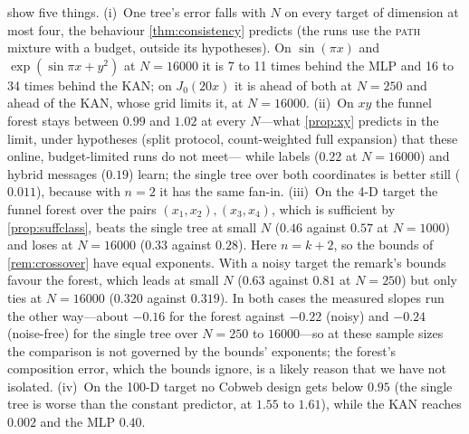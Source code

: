 \documentclass[11pt]{article}
\theoremstyle{definition}
\theoremstyle{remark}
\begin{document}
 show five things.
(i)~One tree's error falls with $N$ on every target of dimension at most four, the
behaviour \cref{thm:consistency} predicts (the runs use the \textsc{path} mixture with a
budget, outside its hypotheses).  On $\sin(\pi x)$ and $\exp(\sin\pi x+y^2)$ at $N=16000$ it is
7 to 11 times behind the MLP and 16 to 34 times behind the KAN; on $J_0(20x)$ it is ahead of
both at $N=250$ and ahead of the KAN, whose grid limits it, at $N=16000$.
(ii)~On $xy$ the funnel forest stays between $0.99$ and $1.02$ at every $N$---what
\cref{prop:xy} predicts in the limit, under hypotheses (split protocol, count-weighted
full expansion) that these online, budget-limited runs do not meet--- while labels ($0.22$ at $N=16000$) and hybrid
messages ($0.19$) learn; the single tree over both coordinates is better still ($0.011$),
because with $n=2$ it has the same fan-in.
(iii)~On the 4-D target the funnel forest over the pairs $(x_1,x_2),(x_3,x_4)$, which is
sufficient by \cref{prop:suffclass}, beats the single tree at small $N$ ($0.46$ against
$0.57$ at $N=1000$) and loses at $N=16000$ ($0.33$ against $0.28$).  Here $n=k+2$, so the
bounds of \cref{rem:crossover} have equal exponents.  With a noisy target the remark's
bounds favour the forest, which leads at small $N$ ($0.63$ against $0.81$ at $N=250$) but
only ties at $N=16000$ ($0.320$ against $0.319$).  In both cases the measured slopes run the
other way---about $-0.16$ for the forest against $-0.22$ (noisy) and $-0.24$ (noise-free)
for the single tree over $N=250$ to $16000$---so at these sample sizes the comparison is not
governed by the bounds' exponents; the forest's composition error, which the bounds
ignore, is a likely reason that we have not isolated.
(iv)~On the 100-D target no Cobweb design gets below $0.95$ (the single tree is worse
than the constant predictor, at $1.55$ to $1.61$), while the KAN reaches $0.002$ and the
MLP $0.40$.

\begin{table}[t]
\centering\small
\resizebox{\linewidth}{!}{}
\caption{The 100-D funnel forest level by level ($N$ training points, one seed): RMSE
of every tree's activation divided by the standard deviation of its ideal message
$m_S$, averaged over the trees of a level.  A ratio near $1$ means the activation
carries no information about $m_S$.}
\label{tab:diag100}
\end{table}
\end{document}
